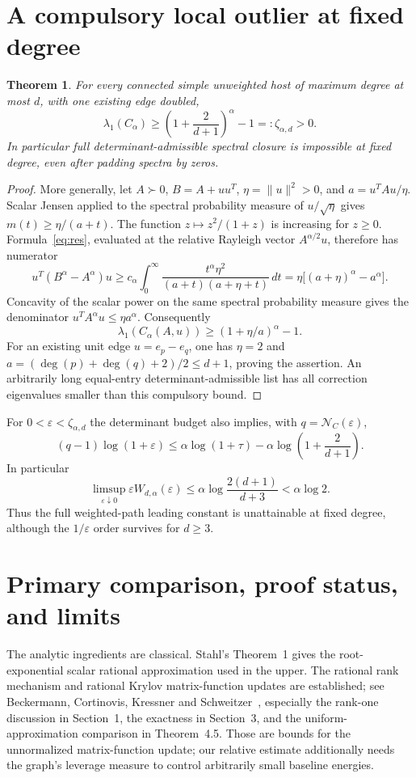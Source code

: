 \documentclass[11pt]{article}
\newtheorem{theorem}{Theorem}[section]
\newcommand{\N}{\mathcal N}
\begin{document}
\section{A compulsory local outlier at fixed degree}
\begin{theorem}\label{thm:outlier}
For every connected simple unweighted host of maximum degree at most
$d$, with one existing edge doubled,
\[
 \lambda_1(C_\alpha)\ge
             \left(1+\frac{2}{d+1}\right)^\alpha-1=:\zeta_{\alpha,d}>0.
\]
In particular full determinant-admissible spectral closure is impossible
at fixed degree, even after padding spectra by zeros.
\end{theorem}
\begin{proof}
More generally, let $A\succ0$, $B=A+uu^T$, $\eta=\|u\|^2>0$,
and $a=u^TAu/\eta$. Scalar Jensen applied to the spectral probability
measure of $u/\sqrt\eta$ gives $m(t)\ge\eta/(a+t)$.
The function $z\mapsto z^2/(1+z)$ is increasing for $z\ge0$.
Formula~\eqref{eq:res}, evaluated at the relative Rayleigh vector
$A^{\alpha/2}u$, therefore has numerator
\[
 u^T(B^\alpha-A^\alpha)u
 \ge c_\alpha\int_0^\infty
          \frac{t^\alpha\eta^2}{(a+t)(a+\eta+t)}\,dt
 =\eta\bigl[(a+\eta)^\alpha-a^\alpha\bigr].
\]
Concavity of the scalar power on the same spectral probability measure
gives the denominator $u^TA^\alpha u\le\eta a^\alpha$. Consequently
\[
 \lambda_1(C_\alpha(A,u))\ge(1+\eta/a)^\alpha-1.
\]
For an existing unit edge $u=e_p-e_q$, one has $\eta=2$ and
$a=(\deg(p)+\deg(q)+2)/2\le d+1$, proving the assertion.
An arbitrarily long equal-entry determinant-admissible list has all
correction eigenvalues smaller than this compulsory bound.
\end{proof}

For $0<\varepsilon<\zeta_{\alpha,d}$ the determinant budget also implies,
with $q=\N_C(\varepsilon)$,
\[
 (q-1)\log(1+\varepsilon)
 \le\alpha\log(1+\tau)-\alpha\log\left(1+\frac2{d+1}\right).
\]
In particular
\[
 \limsup_{\varepsilon\downarrow0}\varepsilon W_{d,\alpha}(\varepsilon)
       \le\alpha\log\frac{2(d+1)}{d+3}<\alpha\log2.
\]
Thus the full weighted-path leading constant is unattainable at fixed
degree, although the $1/\varepsilon$ order survives for $d\ge3$.

\section{Primary comparison, proof status, and limits}
The analytic ingredients are classical. Stahl's Theorem~1 gives the
root-exponential scalar rational approximation used in the upper.
The rational rank mechanism and rational Krylov matrix-function
updates are established; see Beckermann, Cortinovis, Kressner and
Schweitzer~\cite{BCKS}, especially the rank-one discussion in Section~1,
the exactness in Section~3, and the uniform-approximation comparison
in Theorem~4.5. Those are bounds for the unnormalized matrix-function
update; our relative estimate additionally needs the graph's leverage
measure to control arbitrarily small baseline energies.
\end{document}
